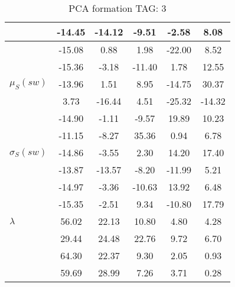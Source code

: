 \begin{table}[h!]
\begin{center}
\begin{tabular}{| l | c | c | c | c | c |}
 & -14.45  & -14.12  & -9.51  & -2.58  & 8.08 \\\hline
 & -15.08  & 0.88  & 1.98  & -22.00  & 8.52 \\\hline
 & -15.36  & -3.18  & -11.40  & 1.78  & 12.55 \\\hline
$\mu_S(sw)$ & -13.96  & 1.51  & 8.95  & -14.75  & 30.37 \\\hline
 & 3.73  & -16.44  & 4.51  & -25.32  & -14.32 \\\hline
 & -14.90  & -1.11  & -9.57  & 19.89  & 10.23 \\\hline
 & -11.15  & -8.27  & 35.36  & 0.94  & 6.78 \\\hline
$\sigma_S(sw)$ & -14.86  & -3.55  & 2.30  & 14.20  & 17.40 \\\hline
 & -13.87  & -13.57  & -8.20  & -11.99  & 5.21 \\\hline
 & -14.97  & -3.36  & -10.63  & 13.92  & 6.48 \\\hline
 & -15.35  & -2.51  & 9.34  & -10.80  & 17.79 \\\hline
$\lambda$ & 56.02  & 22.13  & 10.80  & 4.80  & 4.28 \\\hline
 & 29.44  & 24.48  & 22.76  & 9.72  & 6.70 \\\hline
 & 64.30  & 22.37  & 9.30  & 2.05  & 0.93 \\\hline
 & 59.69  & 28.99  & 7.26  & 3.71  & 0.28 \\\hline
\end{tabular}
\caption{PCA formation TAG: 3}
\end{center}
\end{table}